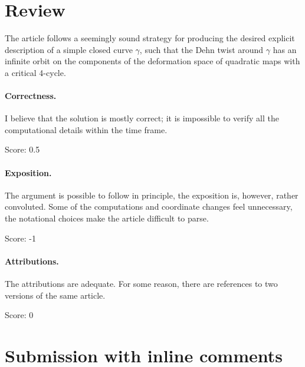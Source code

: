 \documentclass[11pt]{article}
\newcommand{\Sph}{\mathbb S^2}
\newcommand{\Z}{\mathbb Z}
\newcommand{\Teich}{\mathcal T}
\newcommand{\D}{\mathcal D}
\theoremstyle{remark}
\numberwithin{equation}{section}
\begin{document}
\maketitle

\section{Review}

The article follows a seemingly sound strategy for producing the desired explicit description of a simple closed curve $\gamma$, such that the Dehn twist around $\gamma$ has an infinite orbit on the components of the deformation space of quadratic maps with a critical 4-cycle. 

\paragraph{Correctness.}

 I believe that the solution is mostly correct; it is impossible to verify all the computational details within the time frame. 

\noindent Score: 0.5

\paragraph{Exposition.}

The argument is possible to follow in principle, the exposition is, however, rather convoluted. Some of the computations and coordinate changes feel unnecessary, the notational choices make the article difficult to parse. 

\noindent Score: -1

\paragraph{Attributions.}

The attributions are adequate. For some reason, there are references to two versions of the same article.

\noindent Score: 0

\newpage
\section{Submission with inline comments}


\begin{abstract}
Let $f$ be a quadratic rational map one of whose critical points lies in a
cycle $A$ of length four and whose other critical value $v$ lies outside
$A$, and let $B=A\cup\{v\}$. Epstein's deformation space $\D_f\subset\Teich(\Sph,B)$ is
known to be disconnected (Hironaka--Koch). We write down an explicit simple
closed curve $\gamma$ on $(\Sph,B)$, for a normalized model map the image
of a round circle under two Dehn twists about a second round circle,
transported to a general $f$ along a path in parameter space, and prove
that the Dehn twist $T_\gamma$ itself preserves $\D_f$ and that the
translates $T_\gamma^n(D_0)$, $n\in\Z$, of the base component $D_0$ are
pairwise distinct components, using the covering-space framework of
Hironaka--Koch and a winding-number obstruction.
\end{abstract}
\end{document}
